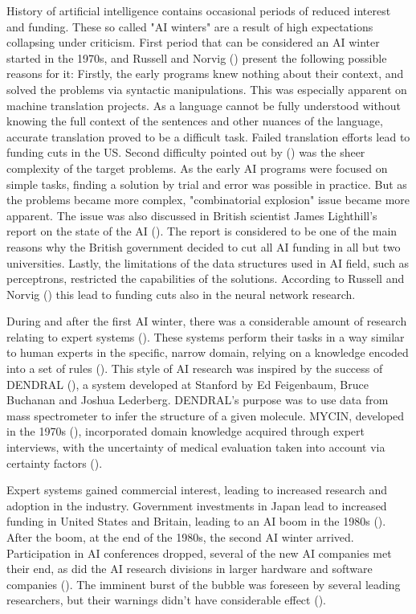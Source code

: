 \documentclass[utf8,english]{gradu3}
\begin{document}
History of artificial intelligence contains occasional periods of reduced
interest and funding. These so called "AI winters" are a result of high
expectations collapsing under criticism. First period that can be considered an
AI winter started in the 1970s, and Russell and Norvig (\cite*{norvig2002})
present the following possible reasons for it: Firstly, the early programs knew
nothing about their context, and solved the problems via syntactic
manipulations. This was especially apparent on machine translation projects. As
a language cannot be fully understood without knowing the full context of the
sentences and other nuances of the language, accurate translation proved to be a
difficult task. Failed translation efforts lead to funding cuts in the US.
Second difficulty pointed out by (\cite{norvig2002}) was the sheer complexity of
the target problems. As the early AI programs were focused on simple tasks,
finding a solution by trial and error was possible in practice. But as the
problems became more complex, "combinatorial explosion" issue became more
apparent. The issue was also discussed in British scientist James Lighthill's
report on the state of the AI (\cite*{lighthill1973}). The report is considered
to be one of the main reasons why the British government decided to cut all AI
funding in all but two universities. Lastly, the limitations of the data
structures used in AI field, such as perceptrons, restricted the capabilities of
the solutions. According to Russell and Norvig (\cite*{norvig2002}) this lead to
funding cuts also in the neural network research.

During and after the first AI winter, there was a considerable amount of
research relating to expert systems (\cite{norvig2002}). These systems perform
their tasks in a way similar to human experts in the specific, narrow domain,
relying on a knowledge encoded into a set of rules (\cite{myers1986}). This
style of AI research was inspired by the success of DENDRAL
(\cite{buchanan1968}), a system developed at Stanford by Ed Feigenbaum, Bruce
Buchanan and Joshua Lederberg. DENDRAL's purpose was to use data from mass
spectrometer to infer the structure of a given molecule. MYCIN, developed in the
1970s (\cite{shortliffe1975}), incorporated domain knowledge acquired through
expert interviews, with the uncertainty of medical evaluation taken into account
via certainty factors (\cite{norvig2002}).

Expert systems gained commercial interest, leading to increased research and
adoption in the industry. Government investments in Japan lead to increased
funding in United States and Britain, leading to an AI boom in the 1980s
(\cite{norvig2002}). After the boom, at the end of the 1980s, the second AI
winter arrived. Participation in AI conferences dropped, several of the new AI
companies met their end, as did the AI research divisions in larger hardware and
software companies (\cite{nilsson2009}). The imminent burst of the bubble was
foreseen by several leading researchers, but their warnings didn't have
considerable effect (\cite{nilsson2009}).
\end{document}
